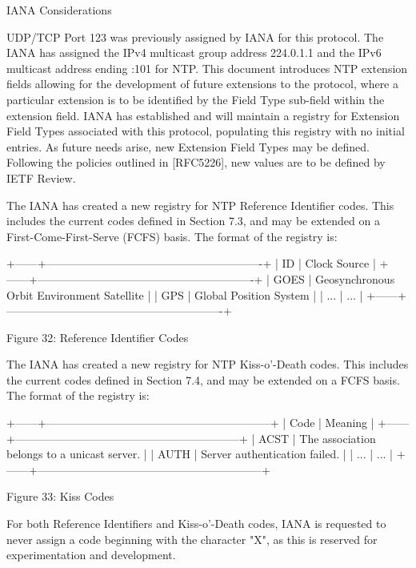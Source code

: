 IANA Considerations

   UDP/TCP Port 123 was previously assigned by IANA for this protocol.
   The IANA has assigned the IPv4 multicast group address 224.0.1.1 and
   the IPv6 multicast address ending :101 for NTP.  This document
   introduces NTP extension fields allowing for the development of
   future extensions to the protocol, where a particular extension is to
   be identified by the Field Type sub-field within the extension field.
   IANA has established and will maintain a registry for Extension Field
   Types associated with this protocol, populating this registry with no
   initial entries.  As future needs arise, new Extension Field Types
   may be defined.  Following the policies outlined in [RFC5226], new
   values are to be defined by IETF Review.

   The IANA has created a new registry for NTP Reference Identifier
   codes.  This includes the current codes defined in Section 7.3, and
   may be extended on a First-Come-First-Serve (FCFS) basis.  The format
   of the registry is:

     +------+----------------------------------------------------------+
     | ID   | Clock Source                                             |
     +------+----------------------------------------------------------+
     | GOES | Geosynchronous Orbit Environment Satellite               |
     | GPS  | Global Position System                                   |
     | ...  | ...                                                      |
     +------+----------------------------------------------------------+

                   Figure 32: Reference Identifier Codes

   The IANA has created a new registry for NTP Kiss-o'-Death codes.
   This includes the current codes defined in Section 7.4, and may be
   extended on a FCFS basis.  The format of the registry is:



   +------+------------------------------------------------------------+
   | Code |                           Meaning                          |
   +------+------------------------------------------------------------+
   | ACST | The association belongs to a unicast server.               |
   | AUTH | Server authentication failed.                              |
   | ...  | ...                                                        |
   +------+------------------------------------------------------------+

                           Figure 33: Kiss Codes

   For both Reference Identifiers and Kiss-o'-Death codes, IANA is
   requested to never assign a code beginning with the character "X", as
   this is reserved for experimentation and development.
